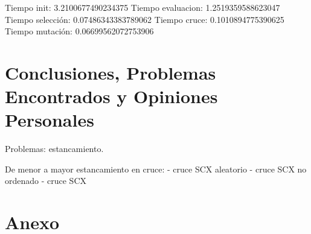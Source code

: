 \documentclass[12pt]{article}
\begin{document}
Tiempo init:  3.2100677490234375
Tiempo evaluacion:  1.2519359588623047
Tiempo selección:  0.07486343383789062
Tiempo cruce:  0.1010894775390625
Tiempo mutación:  0.06699562072753906


\newpage


\newpage

\section{Conclusiones, Problemas Encontrados y Opiniones Personales}

Problemas:
estancamiento.

De menor a mayor estancamiento en cruce:
- cruce SCX aleatorio
- cruce SCX no ordenado
- cruce SCX

\section{Anexo}



\end{document}
